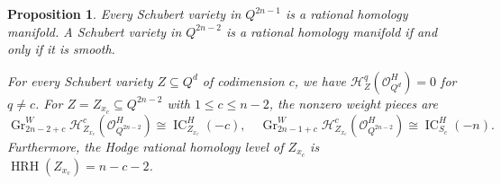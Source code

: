 \documentclass[12pt]{amsart}
\newtheorem{prop}[theorem]{Proposition}
\theoremstyle{definition}
\numberwithin{equation}{section}
\begin{document}
\begin{prop}\label{prop:quadric-cohomology}
Every Schubert variety in $Q^{2n-1}$ is a rational homology
manifold. A Schubert variety in $Q^{2n-2}$ is a rational homology
manifold if and only if it is smooth.

For every Schubert variety $Z\subseteq Q^d$ of codimension $c$,
we have $\mathscr H_Z^q(\mathscr O_{Q^d}^H)=0$ for $q\ne c$.
For $Z=Z_{x_c}\subseteq Q^{2n-2}$ with $1\leq c\leq n-2$,
the nonzero weight pieces are
\begin{equation}\label{eq:quadric-weights}
 \operatorname{Gr}_{2n-2+c}^W
   \mathscr H_{Z_{x_c}}^c(\mathscr O_{Q^{2n-2}}^H)
   \cong\operatorname{IC}_{Z_{x_c}}^H(-c),\quad
 \operatorname{Gr}_{2n-1+c}^W
   \mathscr H_{Z_{x_c}}^c(\mathscr O_{Q^{2n-2}}^H)
   \cong\operatorname{IC}_{S_c}^H(-n).
\end{equation}
Furthermore, the Hodge rational homology level of $Z_{x_c}$ is
$\operatorname{HRH}(Z_{x_c})=n-c-2$.
\end{prop}
\end{document}
